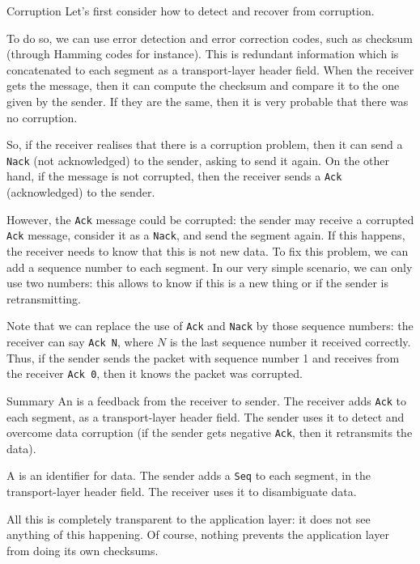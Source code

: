 \documentclass[a4paper]{article}
\begin{document}
\begin{parag}{Corruption}
    Let's first consider how to detect and recover from corruption.

    To do so, we can use error detection and error correction codes, such as checksum (through Hamming codes for instance). This is redundant information which is concatenated to each segment as a transport-layer header field. When the receiver gets the message, then it can compute the checksum and compare it to the one given by the sender. If they are the same, then it is very probable that there was no corruption.

    So, if the receiver realises that there is a corruption problem, then it can send a \texttt{Nack} (not acknowledged) to the sender, asking to send it again. On the other hand, if the message is not corrupted, then the receiver sends a \texttt{Ack} (acknowledged) to the sender. 

    However, the \texttt{Ack} message could be corrupted: the sender may receive a corrupted \texttt{Ack} message, consider it as a \texttt{Nack}, and send the segment again. If this happens, the receiver needs to know that this is not new data. To fix this problem, we can add a sequence number to each segment. In our very simple scenario, we can only use two numbers: this allows to know if this is a new thing or if the sender is retransmitting.

    Note that we can replace the use of \texttt{Ack} and \texttt{Nack} by those sequence numbers: the receiver can say \texttt{Ack N}, where $N$ is the last sequence number it received correctly. Thus, if the sender sends the packet with sequence number 1 and receives from the receiver \texttt{Ack 0}, then it knows the packet was corrupted.

    \begin{subparag}{Summary}
        An  is a feedback from the receiver to sender. The receiver adds \texttt{Ack} to each segment, as a transport-layer header field. The sender uses it to detect and overcome data corruption (if the sender gets negative \texttt{Ack}, then it retransmits the data).

        A  is an identifier for data. The sender adds a \texttt{Seq} to each segment, in the transport-layer header field. The receiver uses it to disambiguate data. 

        All this is completely transparent to the application layer: it does not see anything of this happening. Of course, nothing prevents the application layer from doing its own checksums.
    \end{subparag}
\end{parag}
\end{document}
